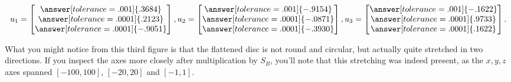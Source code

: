 \documentclass{ximera}
\begin{document}
\begin{problem}
$$u_1=\begin{bmatrix}\answer[tolerance=.001]{.3684}\\\answer[tolerance=.0001]{.2123}\\\answer[tolerance=.0001]{-.9051}\end{bmatrix}, u_2=\begin{bmatrix}\answer[tolerance=.001]{-.9154}\\\answer[tolerance=.0001]{-.0871}\\\answer[tolerance=.0001]{-.3930}\end{bmatrix}, u_3=\begin{bmatrix}\answer[tolerance=.001]{-.1622}\\\answer[tolerance=.0001]{.9733}\\\answer[tolerance=.0001]{.1622}\end{bmatrix}.$$

\end{problem}

What you might notice from this third figure is that the flattened disc is not round and circular, but actually quite stretched in two directions. If you inspect the axes more closely after multiplication by $S_B$, you'll note that this stretching was indeed present, as the $x,y,z$ axes spanned $[-100,100]$, $[-20,20]$ and $[-1,1]$.
\end{document}
